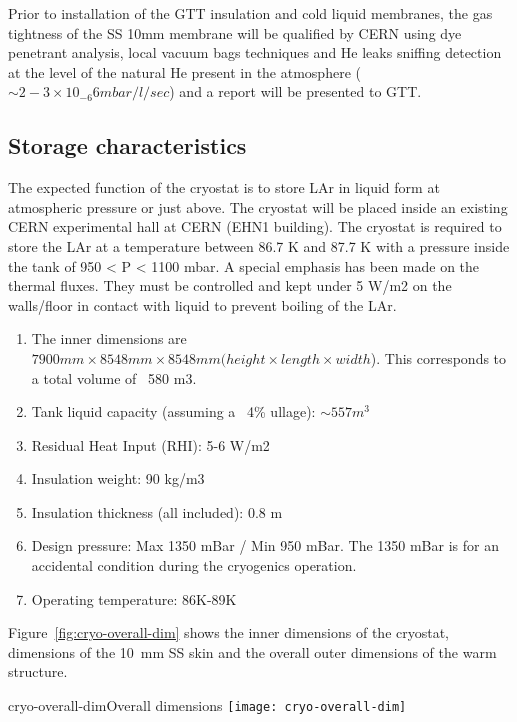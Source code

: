 Prior to installation of the GTT insulation and cold liquid membranes, the gas tightness of the SS 10mm membrane will be qualified by CERN using dye penetrant analysis, local vacuum bags techniques and He leaks sniffing detection at the level of the natural He present in the atmosphere ($\sim2-3 \times 10_{-6}6 mbar/l/sec$) and a report will be presented to GTT.

\subsection{Storage characteristics}


The expected function of the cryostat is to store LAr in liquid form at atmospheric pressure or just above. 
The cryostat will be placed inside an existing CERN experimental hall at CERN (EHN1 building). The 
cryostat is required to store the LAr at a temperature between 86.7 K and 87.7 K with a pressure inside the 
tank of 950 < P < 1100 mbar. A special emphasis has been made on the thermal fluxes. They must be controlled and kept under 5 W/m2 on the walls/floor in contact with liquid to prevent boiling of the LAr.

\begin{enumerate} %
\item The inner dimensions are $7900 mm \times 8548 mm \times 8548 mm (height \times length \times width$).  This corresponds to a total volume of ~580 m3. 
\item Tank liquid capacity (assuming a ~4\% ullage): $\sim 557 m^3$
\item Residual Heat Input (RHI): 5-6 W/m2
\item Insulation weight: 90 kg/m3  
\item Insulation thickness (all included): 0.8 m 
\item Design pressure: Max 1350 mBar / Min 950 mBar.  The 1350 mBar is for an accidental condition during the cryogenics operation.
\item Operating temperature: 86K-89K
\end{enumerate}

Figure~\ref{fig:cryo-overall-dim} shows the inner dimensions of the cryostat, dimensions of the \SI{10}{mm} SS skin and the overall outer dimensions of the warm structure.

\begin{cdrfigure}{cryo-overall-dim}{Overall dimensions}
  \texttt{[image: cryo-overall-dim]}
\end{cdrfigure}

